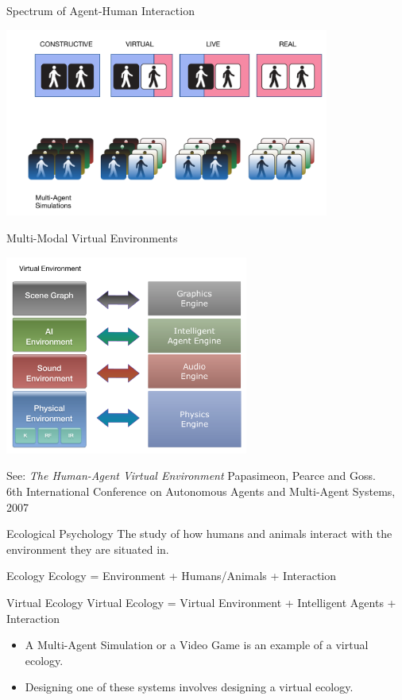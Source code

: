 \documentclass[aspectratio=1610,xcolor=dvipsnames,t]{beamer}
\begin{document}
\begin{frame}{Spectrum of Agent-Human Interaction} 
    \begin{center}
        \includegraphics[width=0.8\textwidth]{spectrum} 
    \end{center} 
\end{frame} 

\begin{frame}{Multi-Modal Virtual Environments} 
    \begin{center}
        \includegraphics[width=8cm]{multi-modal} 
    \end{center} 
    \tiny See: \emph{The Human-Agent Virtual Environment} Papasimeon, Pearce and Goss. \\
    6th International Conference on Autonomous Agents and Multi-Agent Systems, 2007 
    \normalsize
\end{frame} 

\begin{frame}{Ecological Psychology} 
    The study of how humans and animals interact with the environment they are
    situated in. 

    \begin{block}{Ecology} 
        Ecology = Environment + Humans/Animals + Interaction 
    \end{block} 
\pause
    \begin{block}{Virtual Ecology} 
        Virtual Ecology = Virtual Environment + Intelligent Agents + Interaction 
    \end{block} 
\pause
    \begin{itemize} 
        \item A Multi-Agent Simulation or a Video Game is an example of a virtual ecology. 
        \item Designing one of these systems involves designing a virtual ecology. 
    \end{itemize} 
\end{frame} 
\end{document}

